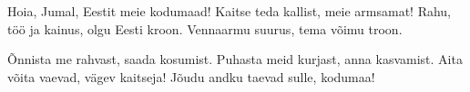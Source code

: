 Hoia, Jumal, Eestit
meie kodumaad!
Kaitse teda kallist,
meie armsamat!
Rahu, t\"o\"o ja kainus,
olgu Eesti kroon.
Vennaarmu suurus,
tema v\~oimu troon.

\~Onnista me rahvast,
saada kosumist.
Puhasta meid kurjast,
anna kasvamist.
Aita v\~oita vaevad,
v\"agev kaitseja!
J\~oudu andku taevad
sulle, kodumaa!